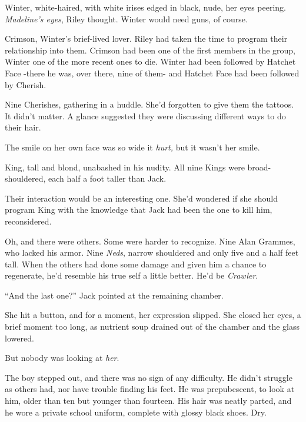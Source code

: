 Winter, white-haired, with white irises edged in black, nude, her eyes peering.  \emph{Madeline's eyes}, Riley thought.  Winter would need guns, of course.



Crimson, Winter's brief-lived lover.  Riley had taken the time to program their relationship into them.  Crimson had been one of the first members in the group, Winter one of the more recent ones to die.  Winter had been followed by Hatchet Face -there he was, over there, nine of them- and Hatchet Face had been followed by Cherish.



Nine Cherishes, gathering in a huddle.  She'd forgotten to give them the tattoos.  It didn't matter.  A glance suggested they were discussing different ways to do their hair.



The smile on her own face was so wide it \emph{hurt, }but it wasn't her smile.



King, tall and blond, unabashed in his nudity.  All nine Kings were broad-shouldered, each half a foot taller than Jack.



Their interaction would be an interesting one.  She'd wondered if she should program King with the knowledge that Jack had been the one to kill him, reconsidered.



Oh, and there were others.  Some were harder to recognize.  Nine Alan Grammes, who lacked his armor.  Nine \emph{Neds}, narrow shouldered and only five and a half feet tall.  When the others had done some damage and given him a chance to regenerate, he'd resemble his true self a little better.  He'd be \emph{Crawler}.



``And the last one?''  Jack pointed at the remaining chamber.



She hit a button, and for a moment, her expression slipped.  She closed her eyes, a brief moment too long, as nutrient soup drained out of the chamber and the glass lowered.



But nobody was looking at \emph{her}.



The boy stepped out, and there was no sign of any difficulty.  He didn't struggle as others had, nor have trouble finding his feet.  He was prepubescent, to look at him, older than ten but younger than fourteen.  His hair was neatly parted, and he wore a private school uniform, complete with glossy black shoes.  Dry.



